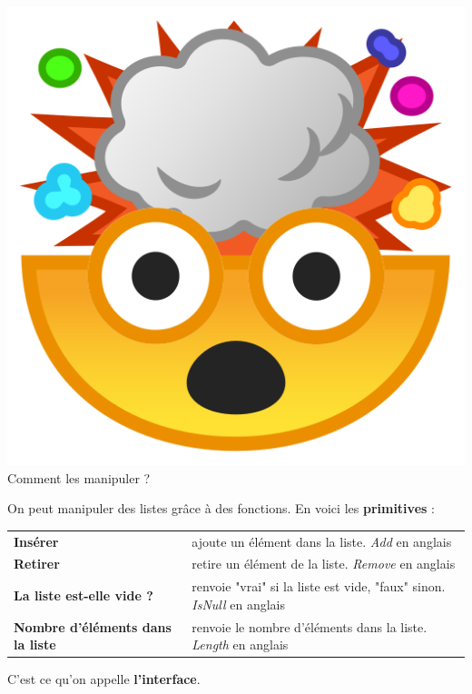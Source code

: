 \documentclass{report}
\begin{document}
\includegraphics[scale=0.03]{mindblow}{\selectfont
Comment les manipuler ?\\
}

On peut manipuler des listes grâce à des fonctions. En voici les \textbf{primitives} :\\

\noindent\begin{tabular}{l | l }
    \textbf{Insérer} & ajoute un élément dans la liste. \textit{Add} en anglais\\
    \textbf{Retirer} & retire un élément de la liste.   \textit{Remove} en anglais \\
    \textbf{La liste est-elle vide ?} & renvoie "vrai" si la liste est vide, "faux" sinon.   \textit{IsNull} en anglais\\
    \textbf{Nombre d'éléments dans la liste} & renvoie le nombre d'éléments dans la liste. \textit{Length} en anglais\\[0.5cm]
\end{tabular}

C'est ce qu'on appelle \textbf{l'interface}.\\
\end{document}
